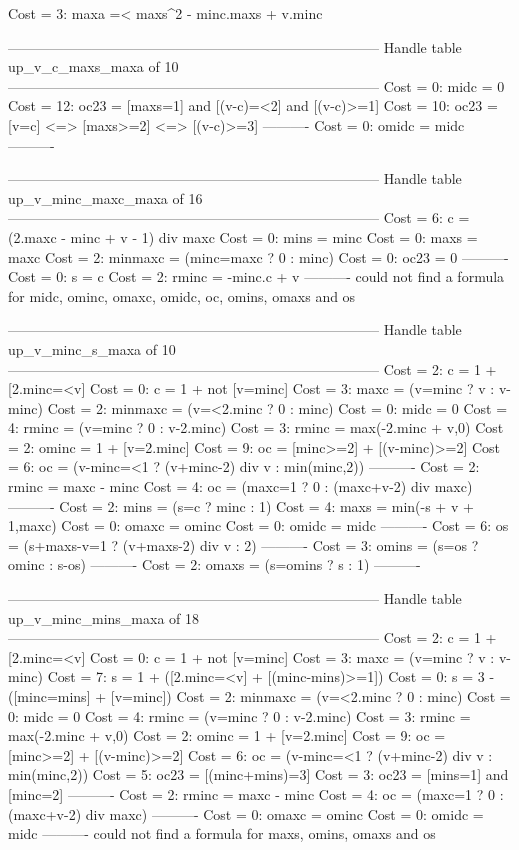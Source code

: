 Cost =  3:  maxa =< maxs^2 - minc.maxs + v.minc

--------------------------------------------------------------------------------
Handle table up_v_c_maxs_maxa of 10
--------------------------------------------------------------------------------
Cost =  0:  midc  = 0
Cost = 12:  oc23  = [maxs=1] and [(v-c)=<2] and [(v-c)>=1]
Cost = 10:  oc23  = [v=c] <=> [maxs>=2] <=> [(v-c)>=3]
----------
Cost =  0:  omidc = midc
----------


--------------------------------------------------------------------------------
Handle table up_v_minc_maxc_maxa of 16
--------------------------------------------------------------------------------
Cost =  6:  c       = (2.maxc - minc + v - 1) div maxc
Cost =  0:  mins    = minc
Cost =  0:  maxs    = maxc
Cost =  2:  minmaxc = (minc=maxc ? 0 : minc)
Cost =  0:  oc23    = 0
----------
Cost =  0:  s       = c
Cost =  2:  rminc   = -minc.c + v
----------
could not find a formula for midc, ominc, omaxc, omidc, oc, omins, omaxs and os


--------------------------------------------------------------------------------
Handle table up_v_minc_s_maxa of 10
--------------------------------------------------------------------------------
Cost =  2:  c       = 1 + [2.minc=<v]
Cost =  0:  c       = 1 + not [v=minc]
Cost =  3:  maxc    = (v=minc ? v : v-minc)
Cost =  2:  minmaxc = (v=<2.minc ? 0 : minc)
Cost =  0:  midc    = 0
Cost =  4:  rminc   = (v=minc ? 0 : v-2.minc)
Cost =  3:  rminc   = max(-2.minc + v,0)
Cost =  2:  ominc   = 1 + [v=2.minc]
Cost =  9:  oc      = [minc>=2] + [(v-minc)>=2]
Cost =  6:  oc      = (v-minc=<1 ? (v+minc-2) div v : min(minc,2))
----------
Cost =  2:  rminc   = maxc - minc
Cost =  4:  oc      = (maxc=1 ? 0 : (maxc+v-2) div maxc)
----------
Cost =  2:  mins    = (s=c ? minc : 1)
Cost =  4:  maxs    = min(-s + v + 1,maxc)
Cost =  0:  omaxc   = ominc
Cost =  0:  omidc   = midc
----------
Cost =  6:  os      = (s+maxs-v=1 ? (v+maxs-2) div v : 2)
----------
Cost =  3:  omins   = (s=os ? ominc : s-os)
----------
Cost =  2:  omaxs   = (s=omins ? s : 1)
----------


--------------------------------------------------------------------------------
Handle table up_v_minc_mins_maxa of 18
--------------------------------------------------------------------------------
Cost =  2:  c       = 1 + [2.minc=<v]
Cost =  0:  c       = 1 + not [v=minc]
Cost =  3:  maxc    = (v=minc ? v : v-minc)
Cost =  7:  s       = 1 + ([2.minc=<v] + [(minc-mins)>=1])
Cost =  0:  s       = 3 - ([minc=mins] + [v=minc])
Cost =  2:  minmaxc = (v=<2.minc ? 0 : minc)
Cost =  0:  midc    = 0
Cost =  4:  rminc   = (v=minc ? 0 : v-2.minc)
Cost =  3:  rminc   = max(-2.minc + v,0)
Cost =  2:  ominc   = 1 + [v=2.minc]
Cost =  9:  oc      = [minc>=2] + [(v-minc)>=2]
Cost =  6:  oc      = (v-minc=<1 ? (v+minc-2) div v : min(minc,2))
Cost =  5:  oc23    = [(minc+mins)=3]
Cost =  3:  oc23    = [mins=1] and [minc=2]
----------
Cost =  2:  rminc   = maxc - minc
Cost =  4:  oc      = (maxc=1 ? 0 : (maxc+v-2) div maxc)
----------
Cost =  0:  omaxc   = ominc
Cost =  0:  omidc   = midc
----------
could not find a formula for maxs, omins, omaxs and os


